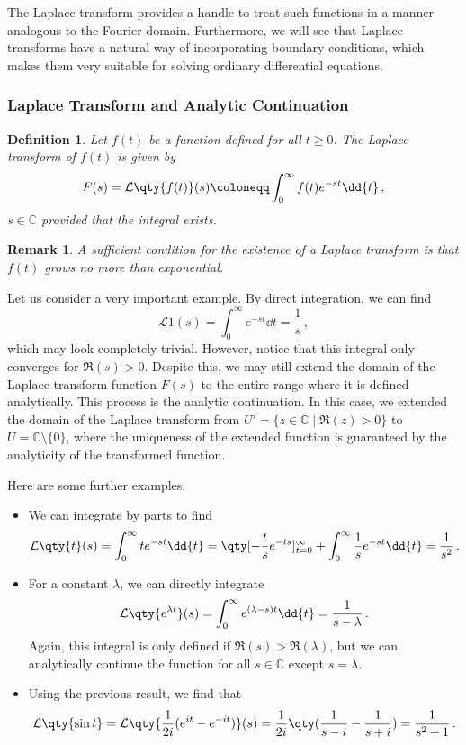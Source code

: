 \documentclass{article}
\theoremstyle{plain}\theoremheaderfont{\normalfont\itshape}\theorembodyfont{\rmfamily}\theoremseparator{.}\newtheorem*{rem}{Remark}\newtheorem*{ex}{Example}\newtheorem*{proof}{Proof}\newtheorem*{altp}{Alternative proof}
\theoremstyle{plain}\theoremheaderfont{\normalfont\bfseries}\theorembodyfont{\rmfamily}\theoremseparator{.}\newtheorem{thm}{Theorem}[section]\newtheorem{lem}[thm]{Lemma}\newtheorem{prop}[thm]{Proposition}\newtheorem*{cor}{Corollary}\newtheorem{defn}[thm]{Definition}\newtheorem{clm}[thm]{Claim}\newtheorem{clminproof}{Claim}
\theoremstyle{break}\theoremheaderfont{\normalfont\itshape}\theorembodyfont{\rmfamily}\theoremseparator{.\medskip}\newtheorem*{proofskip}{Proof}\newtheorem*{exs}{Examples}\newtheorem*{rems}{Remarks}
\theoremstyle{break}\theoremheaderfont{\normalfont\bfseries}\theorembodyfont{\rmfamily}\theoremseparator{.\medskip}\newtheorem{lemskip}[thm]{Lemma}\newtheorem{defnskip}[thm]{Definition}\newtheorem{propskip}[thm]{Proposition}\newtheorem{thmskip}[thm]{Theorem}
\numberwithin{equation}{section}
\newcommand{\lt}[1]{\mathcal{L}\qty{ #1 }}
\begin{document}
	The Laplace transform provides a handle to treat such functions in a manner analogous to the Fourier domain. Furthermore, we will see that Laplace transforms have a natural way of incorporating boundary conditions, which makes them very suitable for solving ordinary differential equations.

	\subsubsection{Laplace Transform and Analytic Continuation}
	\begin{defn}
		Let \(f(t)\) be a function defined for all \(t\ge 0\). The \textit{Laplace transform} of \(f(t)\) is given by
		\[F(s)=\lt{f(t)}(s)\coloneqq\int_{0}^{\infty}f(t)e^{-st}\dd{t}\,,\]
		\(s\in\mathbb{C}\) provided that the integral exists.
	\end{defn}
	\begin{rem}
		A sufficient condition for the existence of a Laplace transform is that \(f(t)\) grows no more than exponential.
	\end{rem}

	Let us consider a very important example. By direct integration, we can find
	\[\lt{1}(s)=\int_{0}^{\infty}e^{-st}\dd{t}=\frac{1}{s}\,,\]
	which may look completely trivial. However, notice that this integral only converges for \(\Re(s)>0\). Despite this, we may still extend the domain of the Laplace transform function \(F(s)\) to the entire range where it is defined analytically. This process is the analytic continuation. In this case, we extended the domain of the Laplace transform from \(U'=\{z\in\mathbb{C}\mid \Re(z)>0\}\) to \(U=\mathbb{C}\setminus\{0\}\), where the uniqueness of the extended function is guaranteed by the analyticity of the transformed function.

	Here are some further examples.
	\begin{itemize}[topsep=0pt]
		\item We can integrate by parts to find
		\[\lt{t}(s)=\int_{0}^{\infty}te^{-st}\dd{t}=\qty[-\frac{t}{s}e^{-ts}]_{t=0}^{\infty}+\int_{0}^{\infty}\frac{1}{s}e^{-st}\dd{t}=\frac{1}{s^2}\,.\]
		\item For a constant \(\lambda\), we can directly integrate
		\[\lt{e^{\lambda t}}(s)=\int_{0}^{\infty}e^{(\lambda-s)t}\dd{t}=\frac{1}{s-\lambda}\,.\]
		Again, this integral is only defined if \(\Re(s)>\Re(\lambda)\), but we can analytically continue the function for all \(s\in\mathbb{C}\) except \(s=\lambda\).
		\item Using the previous result, we find that
		\[\lt{\sin t}=\lt{\frac{1}{2i}(e^{it}-e^{-it})}(s)=\frac{1}{2i}\qty(\frac{1}{s-i}-\frac{1}{s+i})=\frac{1}{s^2+1}\,.\]
	\end{itemize}
\end{document}
